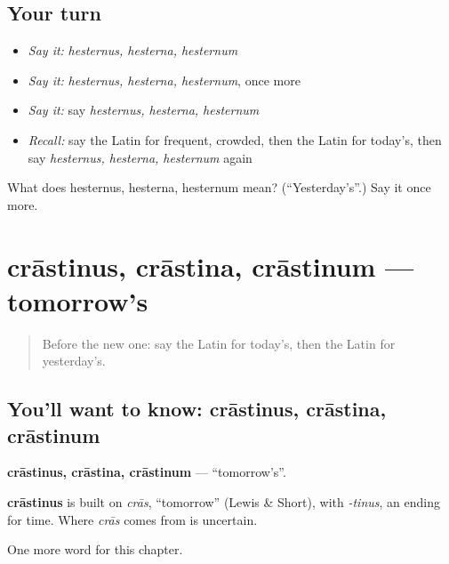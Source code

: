 \subsection*{Your turn}
\begin{itemize}
\raggedright
  \item \emph{Say it:} \emph{hesternus, hesterna, hesternum}
  \item \emph{Say it:} \emph{hesternus, hesterna, hesternum}, once more
  \item \emph{Say it:} say \emph{hesternus, hesterna, hesternum}
  \item \emph{Recall:} say the Latin for frequent, crowded, then the Latin for today's, then say \emph{hesternus, hesterna, hesternum} again
\end{itemize}

\begin{tcolorbox}[breakable,colback=teal!4,colframe=teal!35!black,title={Before you move on}]
What does hesternus, hesterna, hesternum mean? (\textquotedblleft{}Yesterday's\textquotedblright{}.) Say it once more.
\end{tcolorbox}
\section[crāstinus, crāstina, crāstinum]{crāstinus, crāstina, crāstinum — tomorrow's}

\label{lesson:LA-C215-crastinus}



\begin{quote}
Before the new one: say the Latin for today's, then the Latin for yesterday's.
\end{quote}

\subsection*{You'll want to know: crāstinus, crāstina, crāstinum}
\textbf{crāstinus, crāstina, crāstinum} — \textquotedblleft{}tomorrow's\textquotedblright{}.

\begin{cousinweb}
\textbf{crāstinus} is built on \emph{crās}, \textquotedblleft{}tomorrow\textquotedblright{} (Lewis \& Short), with \emph{-tinus}, an ending for time. Where \emph{crās} comes from is uncertain.
\end{cousinweb}

\begin{grammarlens}[title={What you've built}]
One more word for this chapter.
\end{grammarlens}

